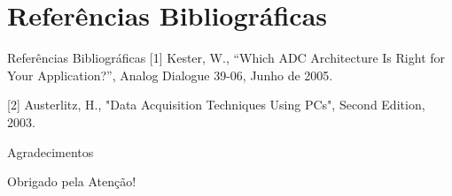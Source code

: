 \documentclass{beamer}
\begin{document}

\section{Referências Bibliográficas}
\begin{frame}{Referências Bibliográficas}
	[1] Kester, W., “Which ADC Architecture Is Right for Your Application?”, Analog Dialogue 39-06, Junho de 2005.

    [2] Austerlitz, H., "Data Acquisition Techniques Using PCs", Second Edition, 2003.
\end{frame}



\begin{frame}{Agradecimentos}
		\begin{center}
			{\Huge Obrigado pela Atenção!}
		\end{center}
\end{frame}
\end{document}
